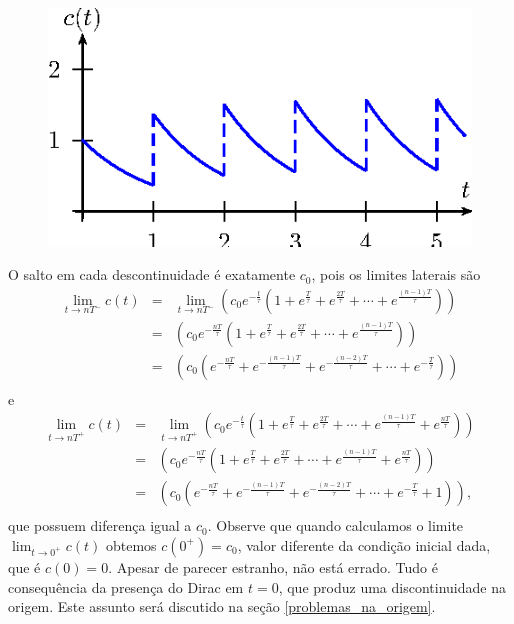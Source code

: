 \begin{figure}[!ht]
\begin{center}

\includegraphics{cap_dirac_conv/pics/figura_12}\end{center}
\caption{\label{concentracao}}
\end{figure}
O salto em cada descontinuidade é exatamente $c_0$, pois os limites laterais são
\begin{eqnarray*}
\lim_{t\to nT^-}c(t)&=&\lim_{t\to nT^-}\left(c_0e^{-\frac{t}{\tau}}\left(1+e^{\frac{T}{\tau}}+e^{\frac{2T}{\tau}}+\cdots+ e^{\frac{(n-1)T}{\tau}}\right)\right)\\
&=&\left(c_0e^{-\frac{nT}{\tau}}\left(1+e^{\frac{T}{\tau}}+e^{\frac{2T}{\tau}}+\cdots+ e^{\frac{(n-1)T}{\tau}}\right)\right)\\
&=&\left(c_0\left(e^{-\frac{nT}{\tau}}+e^{-\frac{(n-1)T}{\tau}}+e^{-\frac{(n-2)T}{\tau}}+\cdots+ e^{-\frac{T}{\tau}}\right)\right)\\
\end{eqnarray*}
e
\begin{eqnarray*}
\lim_{t\to nT^+}c(t)&=&\lim_{t\to nT^+}\left(c_0e^{-\frac{t}{\tau}}\left(1+e^{\frac{T}{\tau}}+e^{\frac{2T}{\tau}}+\cdots+ e^{\frac{(n-1)T}{\tau}}+ e^{\frac{nT}{\tau}}\right)\right)\\
&=&\left(c_0e^{-\frac{nT}{\tau}}\left(1+e^{\frac{T}{\tau}}+e^{\frac{2T}{\tau}}+\cdots+ e^{\frac{(n-1)T}{\tau}}+ e^{\frac{nT}{\tau}}\right)\right)\\
&=&\left(c_0\left(e^{-\frac{nT}{\tau}}+e^{-\frac{(n-1)T}{\tau}}+e^{-\frac{(n-2)T}{\tau}}+\cdots+ e^{-\frac{T}{\tau}}+1\right)\right),\\
\end{eqnarray*}
que possuem diferença igual a $c_0$. 
Observe que quando calculamos o limite $\displaystyle \lim_{t\to 0^+}c(t)$ obtemos $c(0^+)=c_0$, valor diferente da condição inicial dada, que é $c(0)=0$. Apesar de parecer estranho, não está errado. Tudo é consequência da presença do Dirac em $t=0$, que produz uma discontinuidade na origem. Este assunto será discutido na seção \ref{problemas_na_origem}.



